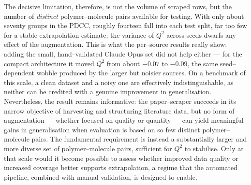 The decisive limitation, therefore, is not the volume of scraped rows, but the number of \emph{distinct} polymer--molecule pairs available for testing. With only about seventy groups in the PDCC, roughly fourteen fall into each test split, far too few for a stable extrapolation estimate; the variance of $Q^2$ across seeds dwarfs any effect of the augmentation. This is what the per--source results really show: adding the small, hand--validated Claude Opus set did not help either --- for the compact architecture it moved $Q^2$ from about $-0.07$ to $-0.09$, the same seed--dependent wobble produced by the larger but noisier sources. On a benchmark of this scale, a clean dataset and a noisy one are effectively indistinguishable, as neither can be credited with a genuine improvement in generalisation. Nevertheless, the result remains informative: the paper--scraper succeeds in its narrow objective of harvesting and structuring literature data, but no form of augmentation --- whether focused on quality or quantity --- can yield meaningful gains in generalisation when evaluation is based on so few distinct polymer--molecule pairs. The fundamental requirement is instead a substantially larger and more diverse set of polymer--molecule pairs, sufficient for $Q^2$ to stabilise. Only at that scale would it become possible to assess whether improved data quality or increased coverage better supports extrapolation, a regime that the automated pipeline, combined with manual validation, is designed to enable.
